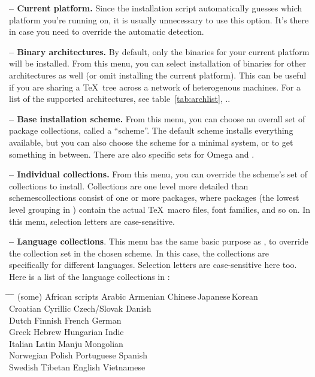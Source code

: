 \documentclass{article}
\begin{document}
\textbf{ -- Current platform.}  Since the installation script
automatically guesses which platform you're running on, it is usually
unnecessary to use this option.  It's there in case you need to override
the automatic detection.

\textbf{ -- Binary architectures.}  By default, only the
binaries for your current platform will be installed.  From this menu,
you can select installation of binaries for other architectures as well
(or omit installing the current platform).  This can be useful if you are
sharing a \TeX\ tree across a network of heterogenous machines.  For a
list of the supported architectures, see table~\ref{tab:archlist},
\p.\pageref{tab:archlist}.

\textbf{ -- Base installation scheme.}  From this menu, you
can choose an overall set of package collections, called a ``scheme''.
The default  scheme installs everything available, but you
can also choose the  scheme for a minimal system, or
 to get something in between.  There are also specific
sets for Omega and .

\textbf{ -- Individual collections.}  From this menu, you can
override the scheme's set of collections to install.  Collections are
one level more detailed than schemes\Dash collections consist of one or
more packages, where packages (the lowest level grouping in \TL) contain
the actual \TeX\ macro files, font families, and so on.  In this menu,
selection letters are case-sensitive.

\textbf{ -- Language collections}.  This menu has the same
basic purpose as , to override the collection set in the chosen
scheme.  In this case, the collections are specifically for different
languages.  Selection letters are case-sensitive here too.  Here is a
list of the language collections in \TL:

\begin{tabbing}
\hspace{.25\linewidth} \=
\hspace{.25\linewidth} \=
\hspace{.25\linewidth} \=
\hspace{.25\linewidth} \kill
(some) African scripts \>
Arabic \>
Armenian \>
Chinese\,Japanese\,Korean \\
Croatian \>
Cyrillic \>
Czech/Slovak \>
Danish \\
Dutch \>
Finnish \>
French \>
German \\
Greek \>
Hebrew \>
Hungarian \>
Indic \\
Italian \>
Latin \>
Manju \>
Mongolian \\
Norwegian \>
Polish \>
Portuguese \>
Spanish \\
Swedish \>
Tibetan \>
 English \>
Vietnamese \\
\end{tabbing}
\end{document}
